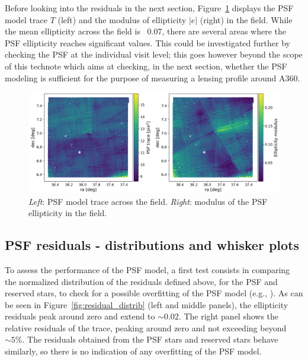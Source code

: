 \documentclass[SE,lsstdraft,authoryear,toc]{lsstdoc}
\begin{document}
Before looking into the residuals in the next section, Figure~\ref{fig:T_and_e} displays the PSF model trace $T$ (left) and the modulus of ellipticity $|e|$ (right) in the field. While the mean ellipticity across the field is ~0.07, there are several areas where the PSF ellipticity reaches significant values. This could be investigated further by checking the PSF at the individual visit level; this goes however beyond the scope of this technote which aims at checking, in the next section, whether the PSF modeling is sufficient for the purpose of measuring a lensing profile around A360.



\begin{figure}
\centering
\includegraphics[width=\textwidth]{Figures/T_and_e.png}
\caption{\emph{Left}: PSF model trace across the field. \emph{Right}: modulus of the PSF ellipticity in the field. \label{fig:T_and_e}}
\end{figure}  


\subsection{PSF residuals - distributions and whisker plots}
To assess the performance of the PSF model, a first test consists in comparing the normalized distribution of the residuals defined above, for the PSF and reserved stars, to check for a possible overfitting of the PSF model (e.g., \citealp{2025OJAp....8E..26S}). As can be seen in Figure~\ref{fig:residual_distrib} (left and middle panels), the ellipticity residuals peak around zero and extend to $\sim 0.02$. The right panel shows the relative residuals of the trace, peaking around zero and not exceeding beyond $\sim 5 \%$. The residuals obtained from the PSF stars and reserved stars behave similarly, so there is no indication of any overfitting of the PSF model.
\end{document}

